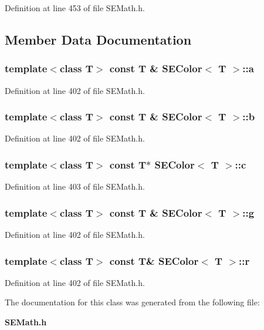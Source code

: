 Definition at line 453 of file S\+E\+Math.\+h.



\subsection{Member Data Documentation}
\subsubsection[{a}]{\setlength{\rightskip}{0pt plus 5cm}template$<$class T$>$ const T \& {\bf S\+E\+Color}$<$ T $>$\+::a}\label{class_s_e_color_a56b9d8e56a22775098a8bec54c21f93e}


Definition at line 402 of file S\+E\+Math.\+h.

\subsubsection[{b}]{\setlength{\rightskip}{0pt plus 5cm}template$<$class T$>$ const T \& {\bf S\+E\+Color}$<$ T $>$\+::b}\label{class_s_e_color_af087334bc49c13128771a402eda77b7a}


Definition at line 402 of file S\+E\+Math.\+h.

\subsubsection[{c}]{\setlength{\rightskip}{0pt plus 5cm}template$<$class T$>$ const T$\ast$ {\bf S\+E\+Color}$<$ T $>$\+::c}\label{class_s_e_color_a1adf2eee31e497a0b63424a000d7588c}


Definition at line 403 of file S\+E\+Math.\+h.

\subsubsection[{g}]{\setlength{\rightskip}{0pt plus 5cm}template$<$class T$>$ const T \& {\bf S\+E\+Color}$<$ T $>$\+::g}\label{class_s_e_color_a3dce3c2fb858a72ae9bca692e90fc372}


Definition at line 402 of file S\+E\+Math.\+h.

\subsubsection[{r}]{\setlength{\rightskip}{0pt plus 5cm}template$<$class T$>$ const T\& {\bf S\+E\+Color}$<$ T $>$\+::r}\label{class_s_e_color_a1dd483a2cca555347a0c01d5da7470d9}


Definition at line 402 of file S\+E\+Math.\+h.



The documentation for this class was generated from the following file\+:\begin{DoxyCompactItemize}
\item 
{\bf S\+E\+Math.\+h}\end{DoxyCompactItemize}
